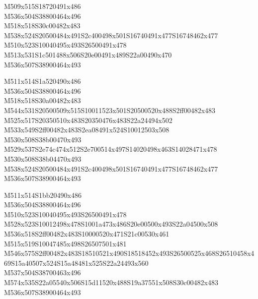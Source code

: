 \documentclass{article}
\begin{document}
\begin{multicols}{5}
\begin{center}

M509x515S18720491x486 %
\\M536x504S38800464x496 %
\\M518x518S30c00482x483 %
\\M538x524S20500484x491S2c400498x501S16740491x477S16748462x477 %
\\M510x523S10040495x493S26500491x478 %
\\M513x531S1c501488x506S20e00491x489S22a00490x470 %
\\M536x507S38900464x493 %
\vfil
\columnbreak

M511x514S1a520490x486 %
\\M536x504S38800464x496 %
\\M518x518S30a00482x483 %
\\M544x531S20500509x515S10011523x501S20500520x488S2ff00482x483 %
\\M525x517S20350510x483S20350476x483S22a24494x502 %
\\M533x549S2ff00482x483S2ea08491x524S10012503x508 %
\\M530x508S38b00470x493 %
\\M529x537S2e74c474x512S2e700514x497S14020498x463S14028471x478 %
\\M530x508S38b04470x493 %
\\M538x524S20500484x491S2c400498x501S16740491x477S16748462x477 %
\\M536x507S38900464x493 %
\vfil
\columnbreak

M511x514S1bb20490x486 %
\\M536x504S38800464x496 %
\\M510x523S10040495x493S26500491x478 %
\\M528x523S10012498x478S1001a473x486S20e00500x493S22a04500x508 %
\\M536x518S2ff00482x483S10000520x471S21c00530x461 %
\\M515x519S10047485x498S26507501x481 %
\\M546x575S2ff00482x483S18510521x490S18518452x493S26500525x468S26510458x469S15a40507x524S15a48481x525S22a24493x560 %
\\M537x504S38700463x496 %
\\M574x535S22a05540x506S15d11520x488S19a37551x508S30c00482x483 %
\\M536x507S38900464x493 %
\vfil
\columnbreak


\end{center}
\end{multicols}
\end{document}
